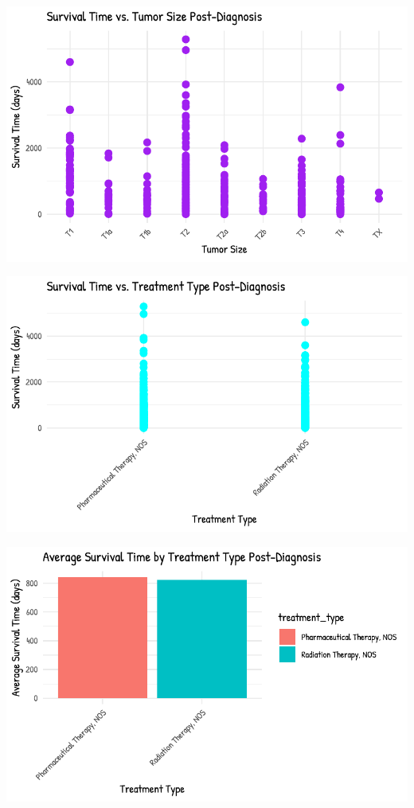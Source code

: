 \documentclass[
  letterpaper,
  DIV=11,
  numbers=noendperiod]{scrartcl}
\begin{document}
\includegraphics{paper_files/figure-pdf/unnamed-chunk-4-8.pdf}

\includegraphics{paper_files/figure-pdf/unnamed-chunk-4-9.pdf}

\includegraphics{paper_files/figure-pdf/unnamed-chunk-4-10.pdf}
\end{document}
